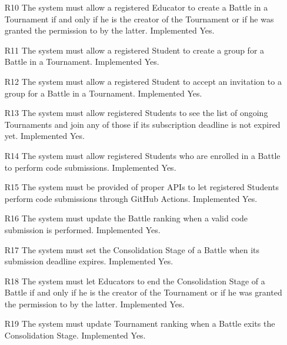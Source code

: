 \documentclass{Configuration_Files/Template}
\begin{document}
\begin{enumerate}
    \item[\textcolor{bluepoli}{R10}] The system must allow a registered Educator to create a Battle in a Tournament if and only if he is the creator of the Tournament or if he was granted the permission to by the latter.
    \textcolor{bluepoli}{Implemented} Yes.
    
    \item[\textcolor{bluepoli}{R11}] The system must allow a registered Student to create a group for a Battle in a Tournament.
    \textcolor{bluepoli}{Implemented} Yes.
    
    \item[\textcolor{bluepoli}{R12}] The system must allow a registered Student to accept an invitation to a group for a Battle in a Tournament.
    \textcolor{bluepoli}{Implemented} Yes.
    
    \item[\textcolor{bluepoli}{R13}] The system must allow registered Students to see the list of ongoing Tournaments and join any of those if its subscription deadline is not expired yet.
    \textcolor{bluepoli}{Implemented} Yes.
    
    \item[\textcolor{bluepoli}{R14}] The system must allow registered Students who are enrolled in a Battle to perform code submissions.
    \textcolor{bluepoli}{Implemented} Yes.
    
    \item[\textcolor{bluepoli}{R15}] The system must be provided of proper APIs to let registered Students perform code submissions through GitHub Actions.
    \textcolor{bluepoli}{Implemented} Yes.
    
    \item[\textcolor{bluepoli}{R16}] The system must update the Battle ranking when a valid code submission is performed.
    \textcolor{bluepoli}{Implemented} Yes.
    
    \item[\textcolor{bluepoli}{R17}] The system must set the Consolidation Stage of a Battle when its submission deadline expires.
    \textcolor{bluepoli}{Implemented} Yes.
    
    \item[\textcolor{bluepoli}{R18}] The system must let Educators to end the Consolidation Stage of a Battle if and only if he is the creator of the Tournament or if he was granted the permission to by the latter.
    \textcolor{bluepoli}{Implemented} Yes.
    
    \item[\textcolor{bluepoli}{R19}] The system must update Tournament ranking when a Battle exits the Consolidation Stage.
    \textcolor{bluepoli}{Implemented} Yes.
    

\end{enumerate}
\end{document}
